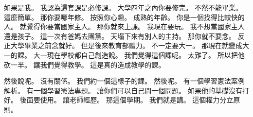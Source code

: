 \hypertarget{c01:cue:615}{}如果是我。
\hypertarget{c01:cue:616}{}我認為這套課是必修課。
\hypertarget{c01:cue:617}{}大學四年之內你要修完。
\hypertarget{c01:cue:618}{}不然不能畢業。
\hypertarget{c01:cue:619}{}這麼簡單。
\hypertarget{c01:cue:620}{}那你要哪年修。
\hypertarget{c01:cue:621}{}按照你心趣。
\hypertarget{c01:cue:622}{}成熟的年齡。
\hypertarget{c01:cue:623}{}你是一個找得比較快的人。
\hypertarget{c01:cue:624}{}就覺得你要當國家主人。
\hypertarget{c01:cue:625}{}那你就來上課。
\hypertarget{c01:cue:626}{}我現在要玩。
\hypertarget{c01:cue:627}{}我不想當國家主人還是孩子。
\hypertarget{c01:cue:628}{}這一次有爸媽去團黨。
\hypertarget{c01:cue:629}{}天塌下來有別人的主持。
\hypertarget{c01:cue:630}{}那你就不要念。
\hypertarget{c01:cue:631}{}反正大學畢業之前念就好。
\hypertarget{c01:cue:632}{}但是後來教育部體力。
\hypertarget{c01:cue:633}{}不一定要大一。
\hypertarget{c01:cue:634}{}那現在就變成大一的課。
\hypertarget{c01:cue:635}{}大一現在學校都自己創造說。
\hypertarget{c01:cue:636}{}我們覺得這個課呢。
\hypertarget{c01:cue:637}{}太難了。
\hypertarget{c01:cue:638}{}所以把他砍一半。
\hypertarget{c01:cue:639}{}讓我們覺得教學。
\hypertarget{c01:cue:640}{}這是真的造成教學的課。

\hypertarget{c01:cue:641}{}然後說呢。
\hypertarget{c01:cue:642}{}沒有關係。
\hypertarget{c01:cue:643}{}我們約一個這樣子的課。
\hypertarget{c01:cue:644}{}然後呢。
\hypertarget{c01:cue:645}{}有一個學習憲法案例解析。
\hypertarget{c01:cue:646}{}有一個學習憲法專題。
\hypertarget{c01:cue:647}{}讓你們可以自己問一個問題。
\hypertarget{c01:cue:648}{}如果他的基礎沒有打好。
\hypertarget{c01:cue:649}{}後面要使用。
\hypertarget{c01:cue:650}{}讓老師經歷。
\hypertarget{c01:cue:651}{}那這個學期。
\hypertarget{c01:cue:652}{}我們就是講。
\hypertarget{c01:cue:653}{}這個權力分立原則。

